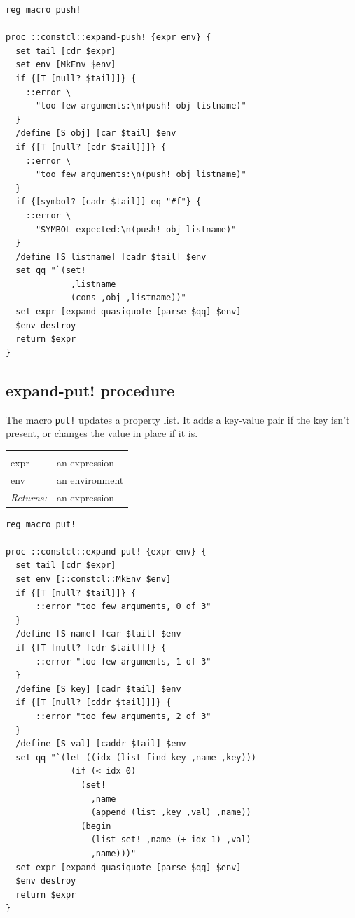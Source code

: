 \documentclass[twoside]{report}
\begin{document}
\begin{lstlisting}
reg macro push!

proc ::constcl::expand-push! {expr env} {
  set tail [cdr $expr]
  set env [MkEnv $env]
  if {[T [null? $tail]]} {
    ::error \
      "too few arguments:\n(push! obj listname)"
  }
  /define [S obj] [car $tail] $env
  if {[T [null? [cdr $tail]]]} {
    ::error \
      "too few arguments:\n(push! obj listname)"
  }
  if {[symbol? [cadr $tail]] eq "#f"} {
    ::error \
      "SYMBOL expected:\n(push! obj listname)"
  }
  /define [S listname] [cadr $tail] $env
  set qq "`(set!
             ,listname
             (cons ,obj ,listname))"
  set expr [expand-quasiquote [parse $qq] $env]
  $env destroy
  return $expr
}
\end{lstlisting}

\subsection{expand-put! procedure}
\label{expandput-procedure}

The macro \texttt{put!} updates a property list. It adds a key-value pair if the key isn't present, or changes the value in place if it is.

\noindent\begin{tabular}{ |p{1.9cm} p{8cm}| }
\hline
\rowcolor[HTML]{CCCCCC} \multicolumn{2}{|l|}{\bf expand-put! (internal)} \\
expr & an expression \\
env & an environment \\
\textit{Returns:} & an expression \\
\hline
\end{tabular}

\begin{lstlisting}
reg macro put!

proc ::constcl::expand-put! {expr env} {
  set tail [cdr $expr]
  set env [::constcl::MkEnv $env]
  if {[T [null? $tail]]} {
      ::error "too few arguments, 0 of 3"
  }
  /define [S name] [car $tail] $env
  if {[T [null? [cdr $tail]]]} {
      ::error "too few arguments, 1 of 3"
  }
  /define [S key] [cadr $tail] $env
  if {[T [null? [cddr $tail]]]} {
      ::error "too few arguments, 2 of 3"
  }
  /define [S val] [caddr $tail] $env
  set qq "`(let ((idx (list-find-key ,name ,key)))
             (if (< idx 0)
               (set!
                 ,name
                 (append (list ,key ,val) ,name))
               (begin
                 (list-set! ,name (+ idx 1) ,val)
                 ,name)))"
  set expr [expand-quasiquote [parse $qq] $env]
  $env destroy
  return $expr
}
\end{lstlisting}
\end{document}
